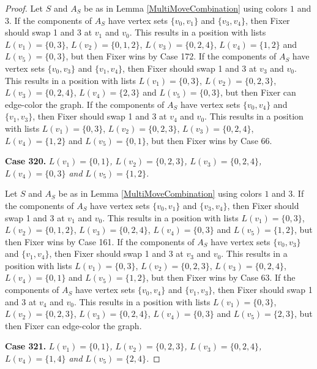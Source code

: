 \documentclass[12pt]{amsart}
\theoremstyle{plain}
\theoremstyle{definition}
\theoremstyle{remark}
\begin{document}
\begin{proof}
Let $S$ and $A_S$ be as in Lemma \ref{MultiMoveCombination} using colors $1$ and $3$. If the components of $A_S$ have vertex sets $\{v_0, v_1\}$ and $\{v_3, v_4\}$, then Fixer should swap 1 and 3 at $v_1$ and $v_0$. This results in a position with lists $L(v_1) = \{0, 3\}$, $L(v_2) = \{0, 1, 2\}$, $L(v_3) = \{0, 2, 4\}$, $L(v_4) = \{1, 2\}$ and $L(v_5) = \{0, 3\}$, but then Fixer wins by Case 172. If the components of $A_S$ have vertex sets $\{v_0, v_3\}$ and $\{v_1, v_4\}$, then Fixer should swap 1 and 3 at $v_3$ and $v_0$. This results in a position with lists $L(v_1) = \{0, 3\}$, $L(v_2) = \{0, 2, 3\}$, $L(v_3) = \{0, 2, 4\}$, $L(v_4) = \{2, 3\}$ and $L(v_5) = \{0, 3\}$, but then Fixer can edge-color the graph. If the components of $A_S$ have vertex sets $\{v_0, v_4\}$ and $\{v_1, v_3\}$, then Fixer should swap 1 and 3 at $v_4$ and $v_0$. This results in a position with lists $L(v_1) = \{0, 3\}$, $L(v_2) = \{0, 2, 3\}$, $L(v_3) = \{0, 2, 4\}$, $L(v_4) = \{1, 2\}$ and $L(v_5) = \{0, 1\}$, but then Fixer wins by Case 66. 

\noindent\textbf{Case 320.  }\textit{$L(v_1) = \{0, 1\}$, $L(v_2) = \{0, 2, 3\}$, $L(v_3) = \{0, 2, 4\}$, $L(v_4) = \{0, 3\}$ and $L(v_5) = \{1, 2\}$.}

Let $S$ and $A_S$ be as in Lemma \ref{MultiMoveCombination} using colors $1$ and $3$. If the components of $A_S$ have vertex sets $\{v_0, v_1\}$ and $\{v_3, v_4\}$, then Fixer should swap 1 and 3 at $v_1$ and $v_0$. This results in a position with lists $L(v_1) = \{0, 3\}$, $L(v_2) = \{0, 1, 2\}$, $L(v_3) = \{0, 2, 4\}$, $L(v_4) = \{0, 3\}$ and $L(v_5) = \{1, 2\}$, but then Fixer wins by Case 161. If the components of $A_S$ have vertex sets $\{v_0, v_3\}$ and $\{v_1, v_4\}$, then Fixer should swap 1 and 3 at $v_3$ and $v_0$. This results in a position with lists $L(v_1) = \{0, 3\}$, $L(v_2) = \{0, 2, 3\}$, $L(v_3) = \{0, 2, 4\}$, $L(v_4) = \{0, 1\}$ and $L(v_5) = \{1, 2\}$, but then Fixer wins by Case 63. If the components of $A_S$ have vertex sets $\{v_0, v_4\}$ and $\{v_1, v_3\}$, then Fixer should swap 1 and 3 at $v_4$ and $v_0$. This results in a position with lists $L(v_1) = \{0, 3\}$, $L(v_2) = \{0, 2, 3\}$, $L(v_3) = \{0, 2, 4\}$, $L(v_4) = \{0, 3\}$ and $L(v_5) = \{2, 3\}$, but then Fixer can edge-color the graph. 

\noindent\textbf{Case 321.  }\textit{$L(v_1) = \{0, 1\}$, $L(v_2) = \{0, 2, 3\}$, $L(v_3) = \{0, 2, 4\}$, $L(v_4) = \{1, 4\}$ and $L(v_5) = \{2, 4\}$.}


\end{proof}
\end{document}
